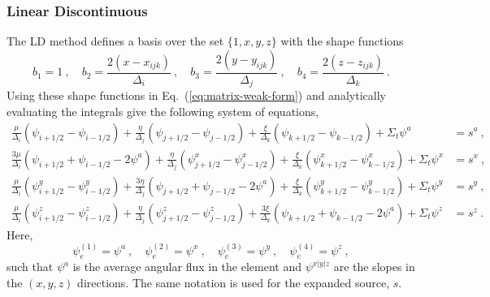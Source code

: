 \documentclass[12pt]{article}
\newcommand{\Di}{\ensuremath{\Delta_i}}
\newcommand{\Dj}{\ensuremath{\Delta_j}}
\newcommand{\Dk}{\ensuremath{\Delta_k}}
\begin{document}
\subsubsection*{Linear Discontinuous}
The LD method defines a basis over the set $\{1, x, y, z\}$ with
the shape functions %
\begin{equation}
  b_1 = 1\:,\quad b_2 = \frac{2(x-x_{ijk})}{\Di}\:,\quad b_3 =
  \frac{2(y-y_{ijk})}{\Dj}\:,\quad b_4 = \frac{2(z-z_{ijk})}{\Dk}\:.
  \label{eq:ld_basis}
\end{equation}
Using these shape functions in Eq.~(\ref{eq:matrix-weak-form}) and
analytically evaluating the integrals give the following system of equations,
\begin{equation}
  \begin{aligned}
    \frac{\mu}{\Di}(\psi_{\scriptscriptstyle i+1/2}- \psi_{\scriptscriptstyle
      i-1/2}) + \frac{\eta}{\Dj}(\psi_{\scriptscriptstyle
      j+1/2}-\psi_{\scriptscriptstyle j-1/2}) +
    \frac{\xi}{\Dk}(\psi_{\scriptscriptstyle k+1/2}-\psi_{\scriptscriptstyle
      k-1/2})
    + \Sigma_t\psi^a &= s^a\:,\\
    \frac{3\mu}{\Di}(\psi_{\scriptscriptstyle i+1/2}+ \psi_{\scriptscriptstyle
      i-1/2}-2\psi^a) + \frac{\eta}{\Dj}(\psi_{\scriptscriptstyle
      j+1/2}^x-\psi_{\scriptscriptstyle j-1/2}^x) +
    \frac{\xi}{\Dk}(\psi_{\scriptscriptstyle k+1/2}^x-\psi_{\scriptscriptstyle
      k-1/2}^x) + \Sigma_t\psi^x &= s^x\:,\\
    \frac{\mu}{\Di}(\psi_{\scriptscriptstyle i+1/2}^y-\psi_{\scriptscriptstyle
      i-1/2}^y) + \frac{3\eta}{\Dj}(\psi_{\scriptscriptstyle
      j+1/2}+\psi_{\scriptscriptstyle j-1/2}-2\psi^a) +
    \frac{\xi}{\Dk}(\psi_{\scriptscriptstyle k+1/2}^y-\psi_{\scriptscriptstyle
      k-1/2}^y) + \Sigma_t\psi^y &= s^y\:,\\
    \frac{\mu}{\Di}(\psi_{\scriptscriptstyle i+1/2}^z-\psi_{\scriptscriptstyle
      i-1/2}^z) + \frac{\eta}{\Dj}(\psi_{\scriptscriptstyle
      j+1/2}^z-\psi_{\scriptscriptstyle j-1/2}^z) +
    \frac{3\xi}{\Dk}(\psi_{\scriptscriptstyle k+1/2}+\psi_{\scriptscriptstyle
      k-1/2}-2\psi^a) + \Sigma_t\psi^z &= s^z\:.
  \end{aligned}
  \label{eq:ld}
\end{equation}
Here,
\begin{equation}
  \psi_e^{(1)}=\psi^a\:,\quad\psi_e^{(2)}=\psi^x\:,\quad
  \psi_e^{(3)}=\psi^y\:,\quad\psi_e^{(4)}=\psi^z\:,
\end{equation}
such that $\psi^a$ is the average angular flux in the element and
$\psi^{x|y|z}$ are the slopes in the $(x,y,z)$ directions.  The same notation
is used for the expanded source, $s$.
\end{document}
